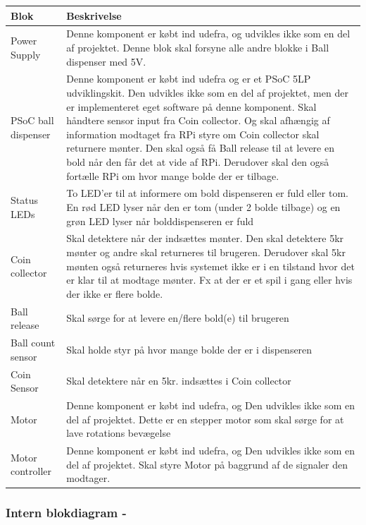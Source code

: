 \documentclass[Arkitektur/System_main.tex]{subfiles}
\begin{document}
\begin{table}[H]
\centering
\begin{tabular}{|L{0.2\columnwidth}|L{0.7\columnwidth}|}
\hline
\textbf{Blok} & \textbf{Beskrivelse} \\ \hline
Power Supply & Denne komponent er købt ind udefra, og udvikles ikke som en del af projektet. Denne blok skal forsyne alle andre blokke i Ball dispenser med 5V.\\ \hline
PSoC ball dispenser & Denne komponent er købt ind udefra og er et PSoC 5LP udviklingskit. Den udvikles ikke som en del af projektet, men der er implementeret eget software på denne komponent. Skal håndtere sensor input fra Coin collector. Og skal afhængig af information modtaget fra RPi styre om Coin collector skal returnere mønter. Den skal også få Ball release til at levere en bold når den får det at vide af RPi. Derudover skal den også fortælle RPi om hvor mange bolde der er tilbage. \\ \hline
Status LEDs & To LED'er til at informere om bold dispenseren er fuld eller tom. En rød LED lyser når den er tom (under 2 bolde tilbage) og en grøn LED lyser når bolddispenseren er fuld\\ \hline
Coin collector & Skal detektere når der indsættes mønter. Den skal detektere 5kr mønter og andre skal returneres til brugeren. Derudover skal 5kr mønten også returneres hvis systemet ikke er i en tilstand hvor det er klar til at modtage mønter. Fx at der er et spil i gang eller hvis der ikke er flere bolde.\\ \hline
Ball release & Skal sørge for at levere en/flere bold(e) til brugeren\\ \hline
Ball count sensor & Skal holde styr på hvor mange bolde der er i dispenseren\\ \hline
Coin Sensor & Skal detektere når en 5kr. indsættes i Coin collector\\ \hline
Motor & Denne komponent er købt ind udefra, og Den udvikles ikke som en del af projektet. Dette er en stepper motor som skal sørge for at lave rotations bevægelse \\ \hline
Motor controller & Denne komponent er købt ind udefra, og Den udvikles ikke som en del af projektet. Skal styre Motor på baggrund af de signaler den modtager.\\ \hline
\end{tabular}
\end{table}

\subsubsection{Intern blokdiagram - } \label{sec:balldispenser_hardware_ibd}
\end{document}
